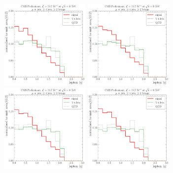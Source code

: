 \begin{figure}[!htbp]
  \centering
    \hspace*{\fill}
    {\includegraphics[width=0.39\textwidth]{measurement/MT/central/fit_templates/muon_templates_bin_0-30}}\hfill
    {\includegraphics[width=0.39\textwidth]{measurement/MT/central/fit_templates/muon_templates_bin_30-50}}
    \hspace*{\fill} \\
    \hspace*{\fill}
    {\includegraphics[width=0.39\textwidth]{measurement/MT/central/fit_templates/muon_templates_bin_50-80}}\hfill
    {\includegraphics[width=0.39\textwidth]{measurement/MT/central/fit_templates/muon_templates_bin_80-100}}

\end{figure}
